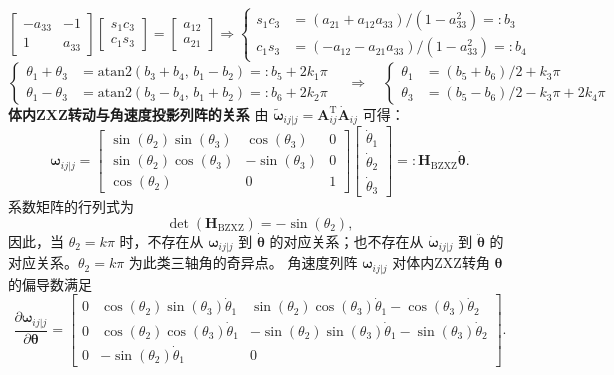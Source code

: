 \[
\begin{bmatrix}
-a_{33} & -1\\
1 & a_{33}
\end{bmatrix}
\begin{bmatrix}
s_1c_3\\
c_1s_3
\end{bmatrix}
=
\begin{bmatrix}
a_{12}\\
a_{21}
\end{bmatrix}
\Rightarrow
\left\{\begin{aligned}
s_1c_3 &= (a_{21}+a_{12}a_{33})/(1-a_{33}^2)=:b_3\\
c_1s_3 &= (-a_{12}-a_{21}a_{33})/(1-a_{33}^2)=:b_4
\end{aligned}\right.
\]
\[
\left\{\begin{aligned}
\theta_1+\theta_3 &= \mathrm{atan2}(b_3+b_4,\,b_1-b_2)=:b_5+2k_1\pi\\
\theta_1-\theta_3 &= \mathrm{atan2}(b_3-b_4,\,b_1+b_2)=:b_6+2k_2\pi
\end{aligned}\right.
\quad\Rightarrow\quad
\left\{\begin{aligned}
\theta_1 &= (b_5+b_6)/2+k_3\pi\\
\theta_3 &= (b_5-b_6)/2-k_3\pi+2k_4\pi
\end{aligned}\right.
\]
\textbf{体内ZXZ转动与角速度投影列阵的关系} 由 $\tilde{\boldsymbol{\omega}}_{ij|j}=\boldsymbol{A}_{ij}^{\mathrm{T}}\dot{\boldsymbol{A}}_{ij}$ 可得：
\[
\boldsymbol{\omega}_{ij|j}=
\begin{bmatrix}
\sin(\theta_2)\sin(\theta_3) & \cos(\theta_3) & 0\\
\sin(\theta_2)\cos(\theta_3) & -\sin(\theta_3) & 0\\
\cos(\theta_2) & 0 & 1
\end{bmatrix}
\begin{bmatrix}
\dot{\theta}_1\\
\dot{\theta}_2\\
\dot{\theta}_3
\end{bmatrix}
=:\boldsymbol{H}_{\mathrm{BZXZ}}\dot{\boldsymbol{\theta}}.
\]
系数矩阵的行列式为
\[
\det(\boldsymbol{H}_{\mathrm{BZXZ}})=-\sin(\theta_2),
\]
因此，当 $\theta_2=k\pi$ 时，不存在从 $\boldsymbol{\omega}_{ij|j}$ 到 $\dot{\boldsymbol{\theta}}$ 的对应关系；也不存在从 $\dot{\boldsymbol{\omega}}_{ij|j}$ 到 $\ddot{\boldsymbol{\theta}}$ 的对应关系。$\theta_2=k\pi$ 为此类三轴角的奇异点。
角速度列阵 $\boldsymbol{\omega}_{ij|j}$ 对体内ZXZ转角 $\boldsymbol{\theta}$ 的偏导数满足
\[
\frac{\partial\boldsymbol{\omega}_{ij|j}}{\partial\boldsymbol{\theta}}=
\begin{bmatrix}
0 & \cos(\theta_2)\sin(\theta_3)\dot{\theta}_1 & \sin(\theta_2)\cos(\theta_3)\dot{\theta}_1-\cos(\theta_3)\dot{\theta}_2\\
0 & \cos(\theta_2)\cos(\theta_3)\dot{\theta}_1 & -\sin(\theta_2)\sin(\theta_3)\dot{\theta}_1-\sin(\theta_3)\dot{\theta}_2\\
0 & -\sin(\theta_2)\dot{\theta}_1 & 0
\end{bmatrix}.
\]
